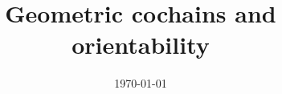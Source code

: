 \documentclass{amsart}
\title{Geometric cochains and orientability}
\date{\today}
\begin{document}
	
	\maketitle
	
	
	
	
	
	
	
	\sloppy
	\printbibliography
	
\end{document}
